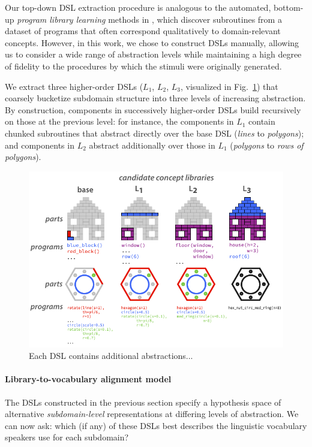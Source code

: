\documentclass[10pt,letterpaper]{article}
\begin{document}
Our top-down DSL extraction procedure is analogous to the automated, bottom-up \textit{program library learning} methods in , which discover subroutines from a dataset of programs that often correspond qualitatively to domain-relevant concepts.
However, in this work, we chose to construct DSLs manually, allowing us to consider a wide range of abstraction levels while maintaining a high degree of fidelity to the procedures by which the stimuli were originally generated.

We extract three higher-order DSLs ($L_1$, $L_2$, $L_3$, visualized in Fig.~\ref{fig:library_gallery}) that coarsely bucketize subdomain structure into three levels of increasing abstraction. By construction, components in successively higher-order DSLs build recursively on those at the previous level: for instance, the components in $L_1$ contain chunked subroutines that abstract directly over the base DSL (\textit{lines} to \textit{polygons}); and components in $L_2$ abstract additionally over those in $L_1$ (\textit{polygons} to \textit{rows of polygons}). 


\begin{figure}[t]
  \begin{center}
  \includegraphics[width=0.99\linewidth]{figures/lax_libraries.pdf}
  \caption{Each DSL contains additional abstractions...}
  \label{fig:library_gallery}
  \end{center}
\end{figure}

\paragraph{Library-to-vocabulary alignment model}
The DSLs constructed in the previous section specify a hypothesis space of alternative \textit{subdomain-level} representations at differing levels of abstraction. We can now ask: which (if any) of these DSLs best describes the linguistic vocabulary speakers use for each subdomain? 
\end{document}
